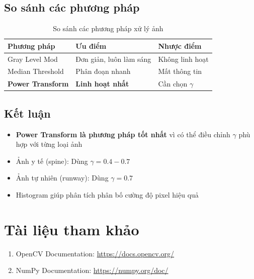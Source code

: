 \documentclass[12pt,a4paper]{article}
\begin{document}
\subsection{So sánh các phương pháp}

\begin{table}[H]
\centering
\caption{So sánh các phương pháp xử lý ảnh}
\begin{tabular}{|l|p{4cm}|p{4cm}|}
\hline
\textbf{Phương pháp} & \textbf{Ưu điểm} & \textbf{Nhược điểm} \\
\hline
Gray Level Mod & Đơn giản, luôn làm sáng & Không linh hoạt \\
\hline
Median Threshold & Phân đoạn nhanh & Mất thông tin \\
\hline
\textbf{Power Transform} & \textbf{Linh hoạt nhất} & Cần chọn $\gamma$ \\
\hline
\end{tabular}
\end{table}

\subsection{Kết luận}

\begin{itemize}
    \item \textbf{Power Transform là phương pháp tốt nhất} vì có thể điều chỉnh $\gamma$ phù hợp với từng loại ảnh
    \item Ảnh y tế (spine): Dùng $\gamma = 0.4 - 0.7$
    \item Ảnh tự nhiên (runway): Dùng $\gamma = 0.7$
    \item Histogram giúp phân tích phân bố cường độ pixel hiệu quả
\end{itemize}

\section{Tài liệu tham khảo}

\begin{enumerate}
    \item OpenCV Documentation: \url{https://docs.opencv.org/}
    \item NumPy Documentation: \url{https://numpy.org/doc/}
\end{enumerate}
\end{document}
